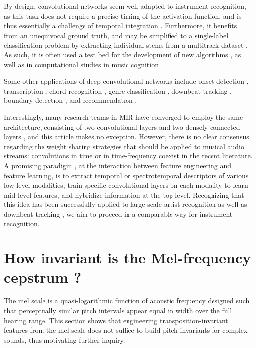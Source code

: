 \documentclass{article}
\begin{document}
By design, convolutional networks seem well adapted to instrument
recognition, as this task does not require a precise timing of the activation function,
and is thus essentially a challenge of temporal integration \cite{Eronen2000, Joder2009}.
Furthermore, it benefits from an unequivocal ground truth, and may be simplified
to a single-label classification problem by extracting individual stems from a
multitrack dataset \cite{Bittner2014}.
As such, it is often used a test bed for the development of new algorithms
\cite{McFee2015-muda, Li2015},
as well as in computational studies in music cognition \cite{Newton2012, Patil2012}.

Some other applications of deep convolutional networks include onset
detection \cite{Schluter2014}, transcription \cite{Sigtia2015},
chord recognition \cite{Humphrey2012tonnetz},
genre classification \cite{Choi2015},
downbeat tracking \cite{Durand2016},
boundary detection \cite{Ullrich2014}, and
recommendation \cite{vandenOord2013}.

Interestingly, many research teams in MIR have converged to employ the same
architecture, consisting of two convolutional layers and two densely connected layers
\cite{Dieleman2014, Humphrey2012tonnetz,
Kereliuk2015, Li2015, McFee2015-muda, Schluter2014, Ullrich2014}, and this
article makes no exception.
However, there is no clear consensus regarding the
weight sharing strategies that should be applied to musical audio streams:
convolutions in time or in time-frequency coexist in the recent literature.
A promising paradigm \cite{Dieleman2011, Durand2016}, at the interaction
between feature engineering and feature learning, is to extract
temporal or spectrotemporal descriptors of various low-level modalities,
train specific convolutional layers on each modality
to learn mid-level features, and hybridize information at the top level.
Recognizing that this idea has been successfully applied to large-scale artist
recognition \cite{Dieleman2011} as well as downbeat tracking
\cite{Durand2016}, we aim to proceed in a comparable way for instrument
recognition.

\section{How invariant is the Mel-frequency cepstrum ?}
The mel scale is a quasi-logarithmic function of acoustic frequency designed such that
perceptually similar pitch intervals appear equal in width over the full hearing range.
This section shows that engineering transposition-invariant features from the mel
scale does not suffice to build pitch invariants for complex sounds, thus motivating
further inquiry.
\end{document}
